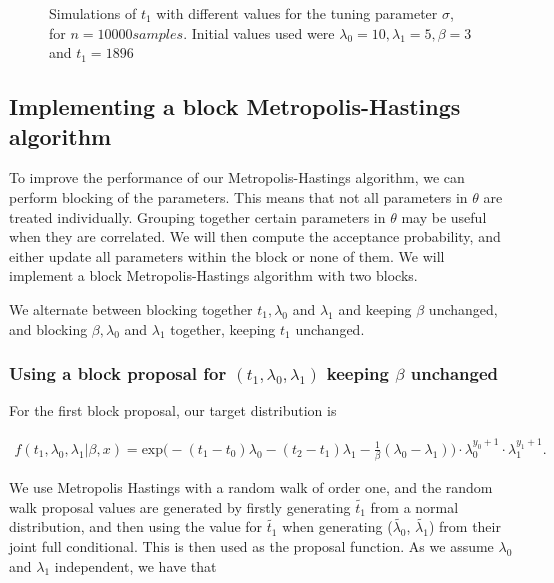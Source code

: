 \begin{figure}[h]
\begin{subfigure}[b]{0.49\textwidth}
        \caption{}
        \label{fig:tuning_single_15}
    \end{subfigure}
    \caption{Simulations of $t_1$ with different values for the tuning parameter $\sigma$, for $n = 10000 samples$. Initial values used were $\lambda_0 = 10, \lambda_1 = 5, \beta = 3$ and $t_1 = 1896$}
    \label{fig:tuning_t_single}
\end{figure}




\subsection{Implementing a block Metropolis-Hastings algorithm}

To improve the performance of our Metropolis-Hastings algorithm, we can perform blocking of the parameters. This means that not all parameters in $\theta$ are treated individually. Grouping together certain parameters in $\theta$ may be useful when they are correlated. We will then compute the acceptance probability, and either update all parameters within the block or none of them. We will implement a block Metropolis-Hastings algorithm with two blocks.


We alternate between blocking together $t_1, \lambda_0$ and  $ \lambda_1$ and keeping $\beta$ unchanged, and blocking $\beta, \lambda_0$ and $\lambda_1$ together, keeping $t_1$ unchanged.


\subsubsection{Using a block proposal for $(t_1, \lambda_0, \lambda_1)$ keeping $\beta$ unchanged}


For the first block proposal, our target distribution is

\begin{align}
    f(t_1, \lambda_0, \lambda_1|\beta, x) = \text{exp} \Big( -(t_1-t_0)\lambda_0 -(t_2-t_1)\lambda_1 - \frac{1}{\beta}(\lambda_0 - \lambda_1)\Big) \cdot\lambda_0^{y_0 + 1} \cdot \lambda_1^{y_1 + 1}.
\end{align}

We use Metropolis Hastings with a random walk of order one, and the random walk proposal values are generated by firstly generating $\widetilde{t_1}$ from a normal distribution, and then using the value for $\widetilde{t_1}$ when generating ($\widetilde{\lambda_0}$, $\widetilde{\lambda_1}$) from their joint full conditional. This is then used as the proposal function. As we assume $\lambda_0$ and $\lambda_1$ independent, we have that 

